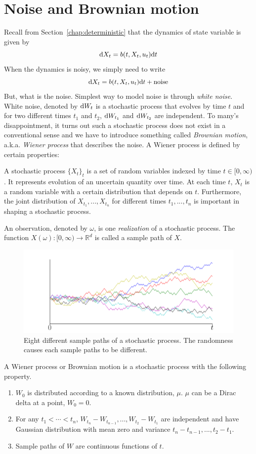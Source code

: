\documentclass[11pt]{book}
\newcommand{\dt}{\text{\normalfont d}t}
\newcommand{\dX}{\text{\normalfont d}X}
\newcommand{\dW}{\text{\normalfont d}W}
\begin{document}
\section{Noise and Brownian motion}
Recall from Section~\ref{chap:deterministic} that the dynamics of state variable is given by
\[
\dX_t=b(t,X_t,u_t)\dt
\]
When the dynamics is noisy, we simply need to write
\[
\dX_t=b(t,X_t,u_t)\dt+\text{noise}
\]
But, what is the noise. Simplest way to model noise is through \emph{white noise}. White noise, denoted by $\dW_t$ is a stochastic process that evolves by time $t$ and for two different times $t_1$ and $t_2$, $\dW_{t_1}$ and $\dW_{t_2}$ are independent. To many's disappointment, it turns out such a stochastic process does not exist in a conventional sense and we have to introduce something called \emph{Brownian motion}, a.k.a. \emph{Wiener process} that describes the noise.
A Wiener process is defined by certain properties:
\begin{defn}
A stochastic process $\{X_t\}_{t}$ is a set of random variables indexed by time $t\in[0,\infty)$. It represents evolution of an uncertain quantity over time. At each time $t$, $X_t$ is a random variable with a certain distribution that depends on $t$. Furthermore, the joint distribution of $X_{t_1},...,X_{t_n}$ for different times $t_1,...,t_n$ is important in shaping a stochastic process.

An observation, denoted by $\omega$, is one \emph{realization} of a stochastic process. The function $X(\omega):[0,\infty)\to\mathbb{R}^d$ is called a sample path of $X$.
\end{defn}
\begin{figure}[H]
    \centering
    \includegraphics[width=0.95\linewidth]{Control_lecture_notes/Figs/bm_1d_100.png}
    \caption{Eight different sample paths of a stochastic process. The randomness causes each sample paths to be different.}
    \label{fig:random_var}
\end{figure}
\begin{defn}\label{defn:bm}
    A Wiener process or Brownian motion is a stochastic process with the following property.
    \begin{enumerate}[label = \bfseries \arabic*)]
        \item $W_0$ is distributed according to a known distribution, $\mu$. $\mu$ can be a Dirac delta at a point, $W_0=0$.
        \item For any $t_{1}<\cdots<t_{n}$, $W_{t_{n}}-W_{t_{n-1}},...,W_{t_{2}}-W_{t_{1}}$ are independent and have Gaussian distribution with mean zero and variance $t_{n}-t_{n-1},...,t_{2}-t_{1}$.
        \item Sample paths of $W$ are continuous functions of $t$.
    \end{enumerate}
\end{defn}
\end{document}

